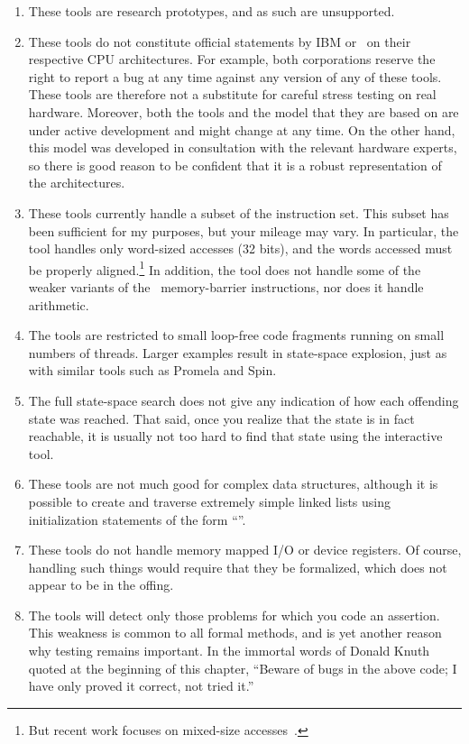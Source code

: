 \begin{enumerate}
\item	These tools are research prototypes, and as such are unsupported.
\item	These tools do not constitute official statements by IBM or \ARM\
	on their respective CPU architectures. For example, both
	corporations reserve the right to report a bug at any time against
	any version of any of these tools. These tools are therefore not a
	substitute for careful stress testing on real hardware. Moreover,
	both the tools and the model that they are based on are under
	active development and might change at any time. On the other
	hand, this model was developed in consultation with the relevant
	hardware experts, so there is good reason to be confident that
	it is a robust representation of the architectures.
\item	These tools currently handle a subset of the instruction set.
	This subset has been sufficient for my purposes, but your mileage
	may vary. In particular, the tool handles only word-sized accesses
	(32 bits), and the words accessed must be properly aligned.\footnote{
		But recent work focuses on mixed-size
		accesses~\cite{Flur:2017:MCA:3093333.3009839}.}
	In addition, the tool does not handle some of the weaker variants
	of the \ARM\ memory-barrier instructions, nor does it handle
	arithmetic.
\item	The tools are restricted to small loop-free code fragments
	running on small numbers of threads. Larger examples result
	in state-space explosion, just as with similar tools such as
	Promela and Spin.
\item	The full state-space search does not give any indication of how
	each offending state was reached. That said, once you realize
	that the state is in fact reachable, it is usually not too hard
	to find that state using the interactive tool.
\item	These tools are not much good for complex data structures, although
	it is possible to create and traverse extremely simple linked
	lists using initialization statements of the form
	``''.
\item	These tools do not handle memory mapped I/O or device registers.
	Of course, handling such things would require that they be
	formalized, which does not appear to be in the offing.
\item	The tools will detect only those problems for which you code an
	assertion. This weakness is common to all formal methods, and
	is yet another reason why testing remains important. In the
	immortal words of Donald Knuth quoted at the beginning of this
	chapter, ``Beware of bugs in the above
	code; I have only proved it correct, not tried it.''
\end{enumerate}

